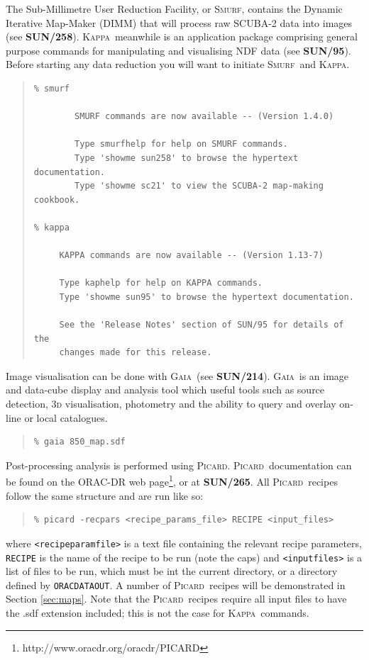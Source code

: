 \documentclass[twoside,11pt]{article}
\newcommand{\htmladdnormallinkfoot}[2]{#1\footnote{#2}}
\newcommand{\xref}[3]{#1}
\renewcommand{\_}{\texttt{\symbol{95}}}
\newenvironment{myquote}{\begin{quote}\begin{small}}{\end{small}\end{quote}}
\newcommand{\Kappa}{\xref{\textsc{Kappa}}{sun95}{}}
\newcommand{\gaia}{\xref{\textsc{Gaia}}{sun214}{}}
\newcommand{\picard}{\xref{\textsc{Picard}}{sun231}{}}
\newcommand{\smurf}{\xref{\textsc{Smurf}}{sun258}{}}
\newcommand{\param}[1]{\texttt{#1}}
\newcommand{\picardsun}{\xref{\textbf{SUN/265}}{sun265}{}}
\newcommand{\kappasun}{\xref{\textbf{SUN/95}}{sun95}{}}
\newcommand{\smurfsun}{\xref{\textbf{SUN/258}}{sun258}{}}
\newcommand{\gaiasun}{\xref{\textbf{SUN/214}}{sun214}{}}
\begin{document}
The Sub-Millimetre User Reduction Facility, or \smurf, contains the Dynamic Iterative Map-Maker (DIMM) that will process raw SCUBA-2 data into images (see \smurfsun). \Kappa\ meanwhile is an application package comprising general purpose commands for manipulating and visualising NDF data (see \kappasun). Before starting any data reduction you will want to initiate \smurf\ and \Kappa.
\begin{myquote}
\begin{verbatim}
% smurf

        SMURF commands are now available -- (Version 1.4.0)

        Type smurfhelp for help on SMURF commands.
        Type 'showme sun258' to browse the hypertext documentation.
        Type 'showme sc21' to view the SCUBA-2 map-making cookbook.

% kappa

     KAPPA commands are now available -- (Version 1.13-7)

     Type kaphelp for help on KAPPA commands.
     Type 'showme sun95' to browse the hypertext documentation.

     See the 'Release Notes' section of SUN/95 for details of the
     changes made for this release.
\end{verbatim}
\end{myquote}
Image visualisation can be done with \gaia\ (see \gaiasun). \gaia\ is an image and data-cube display and analysis tool which useful tools such as source detection, 3\textsc{d} visualisation, photometry and the ability to query and overlay on-line  or local catalogues. 
\begin{myquote}
\begin{verbatim}
% gaia 850_map.sdf
\end{verbatim}
\end{myquote}

Post-processing analysis is performed using \picard. \picard\ documentation can be found on \htmladdnormallinkfoot{the ORAC-DR web page}{http://www.oracdr.org/oracdr/PICARD}, or at \picardsun. All \picard\ recipes follow the same structure and are run like so:
\begin{myquote}
\begin{verbatim}
% picard -recpars <recipe_params_file> RECIPE <input_files>
\end{verbatim}
\end{myquote}
where \param{<recipe\_param\_file>} is a text file containing the relevant recipe parameters, \param{RECIPE} is the name of the recipe to be run (note the caps) and \param{<input\_files>} is a list of files to be run, which must be int the current directory, or a directory defined by \param{ORAC\_DATA\_OUT}. A number of \picard\ recipes will be demonstrated in Section \ref{sec:maps}. Note that the \picard\ recipes require all input files to have the .sdf extension included; this is not the case for \Kappa\ commands. 
\end{document}
